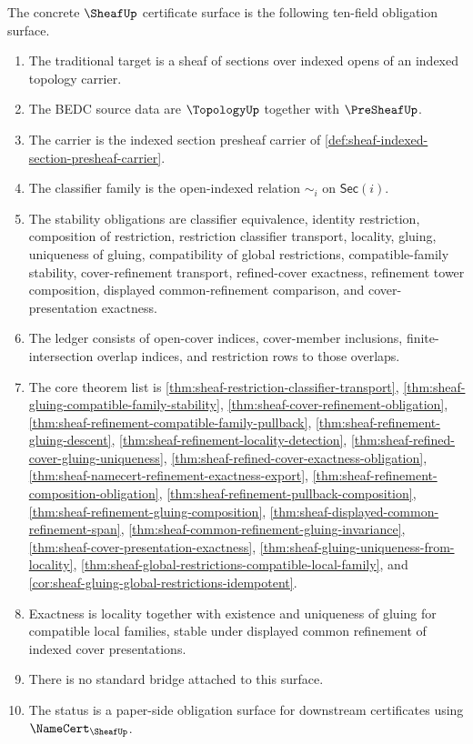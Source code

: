\begin{theorem}
\label{thm:sheaf-namecert-obligation-surface}
The concrete $\SheafUp$ certificate surface is the following ten-field obligation surface.
\begin{enumerate}
\item The traditional target is a sheaf of sections over indexed opens of an indexed topology carrier.
\item The BEDC source data are $\TopologyUp$ together with $\PreSheafUp$.
\item The carrier is the indexed section presheaf carrier of \autoref{def:sheaf-indexed-section-presheaf-carrier}.
\item The classifier family is the open-indexed relation $\sim_i$ on $\mathsf{Sec}(i)$.
\item The stability obligations are classifier equivalence, identity restriction, composition of restriction, restriction classifier transport, locality, gluing, uniqueness of gluing, compatibility of global restrictions, compatible-family stability, cover-refinement transport, refined-cover exactness, refinement tower composition, displayed common-refinement comparison, and cover-presentation exactness.
\item The ledger consists of open-cover indices, cover-member inclusions, finite-intersection overlap indices, and restriction rows to those overlaps.
\item The core theorem list is \autoref{thm:sheaf-restriction-classifier-transport}, \autoref{thm:sheaf-gluing-compatible-family-stability}, \autoref{thm:sheaf-cover-refinement-obligation}, \autoref{thm:sheaf-refinement-compatible-family-pullback}, \autoref{thm:sheaf-refinement-gluing-descent}, \autoref{thm:sheaf-refinement-locality-detection}, \autoref{thm:sheaf-refined-cover-gluing-uniqueness}, \autoref{thm:sheaf-refined-cover-exactness-obligation}, \autoref{thm:sheaf-namecert-refinement-exactness-export}, \autoref{thm:sheaf-refinement-composition-obligation}, \autoref{thm:sheaf-refinement-pullback-composition}, \autoref{thm:sheaf-refinement-gluing-composition}, \autoref{thm:sheaf-displayed-common-refinement-span}, \autoref{thm:sheaf-common-refinement-gluing-invariance}, \autoref{thm:sheaf-cover-presentation-exactness}, \autoref{thm:sheaf-gluing-uniqueness-from-locality}, \autoref{thm:sheaf-global-restrictions-compatible-local-family}, and \autoref{cor:sheaf-gluing-global-restrictions-idempotent}.
\item Exactness is locality together with existence and uniqueness of gluing for compatible local families, stable under displayed common refinement of indexed cover presentations.
\item There is no standard bridge attached to this surface.
\item The status is a paper-side obligation surface for downstream certificates using $\NameCert_{\SheafUp}$.
\end{enumerate}
\end{theorem}
